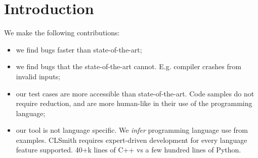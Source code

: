 \section{Introduction}\label{sec:intro}

We make the following contributions:
%
\begin{itemize}
\item we find bugs faster than state-of-the-art;
\item we find bugs that the state-of-the-art cannot. E.g. compiler crashes from invalid inputs;
\item our test cases are more accessible than state-of-the-art. Code samples do not require reduction, and are more human-like in their use of the programming language;
\item our tool is not language specific. We \emph{infer} programming language use from examples. CLSmith requires expert-driven development for every language feature supported. 40+k lines of C++ vs a few hundred lines of Python.
\end{itemize}

